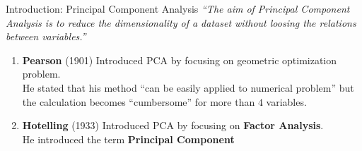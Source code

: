 \documentclass[10pt]{beamer}
\theoremstyle{definition}
\newcommand{\1}{\mathbbm{1}}
\begin{document}
\begin{frame}{Introduction: Principal Component Analysis}{}
    {\it ``The aim of Principal Component Analysis is to reduce the
    dimensionality of a dataset without loosing the relations between variables.''}
  \begin{enumerate}
    \item {\bf Pearson} (1901) Introduced PCA by focusing on geometric
      optimization problem.\\
      He stated that his method ``can be easily applied
      to numerical problem'' but the calculation becomes ``cumbersome'' for
      more than $4$ variables.
    \item {\bf Hotelling} (1933) Introduced PCA by focusing on {\bf Factor
      Analysis}.\\
      He introduced the term {\bf Principal Component}
  \end{enumerate}
\end{frame}
\end{document}
